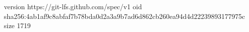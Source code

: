 version https://git-lfs.github.com/spec/v1
oid sha256:4ab1af9c8abfaf7b78bda0d2a3a9b7ad6d862cb260ea94d4d22239893177975c
size 1719
